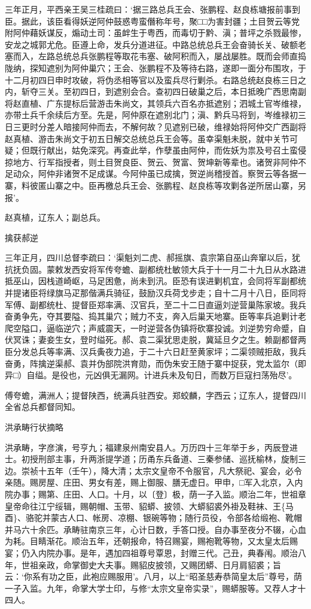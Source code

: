 \documentclass[]{article}
\begin{document}
三年正月，平西亲王吴三桂疏曰：`据三路总兵王会、张鹏程、赵良栋塘报前事到臣。据此，该臣看得妖逆阿仲鼓惑粤蛮僭称年号，聚□□为害封疆；土目贺云等党附阿仲藉妖谋反，煽动土司：虽衅生于粤西，而毒切于黔、滇；普坪之杀戮最惨，安龙之城郭尤危。臣遵上命，发兵分道进征。中路总统总兵王会奋骑长关、破额老塞而入，左路总统总兵张鹏程等取花韦塞、破阿积而入，屡战屡胜。既而会师直捣陇纳，探知遮别为阿仲巢穴；王会、张鹏程不及等待右路，遂即一面分布围攻，于十二月初四日申时攻破，将伪丞相等官以及蛮兵尽行剿杀。右路总统赵良栋三日之内，斩夺三关。至初四日，到遮别会合。查初四日破巢之后，本日抵晚广西思南副将赵直植、广东提标后营游击朱尚文，其领兵六百名亦抵遮别；泗城土官岑维禄，亦带土兵千余续后方至。先是，阿仲原在遮别北门；滇、黔兵马将到，岑维禄初三日三更时分差人暗接阿仲而去，不解何故？见遮别已破，维禄始将阿仲交广西副将赵真植、游击朱尚文于初五日解交总统总兵王会等。虽幸渠魁未脱，就中关节可疑；但既行献出，姑免深究。再查此举，作孽虽由阿仲，而佐妖为祟及号召土蛮侵掠地方、行军指授者，则土目贺良臣、贺云、贺富、贺坤新等辈也。诸贺非阿仲不足动众，阿仲非诸贺不足成谋。今阿仲虽已成擒，贺逆尚稽授首。察贺云等各据一寨，料彼匿山寨之中。臣再檄总兵王会、张鹏程、赵良栋等攻剿各逆所居山寨，另报'。

赵真植，辽东人；副总兵。

擒获郝逆

三年正月，四川总督李疏曰：`渠魁刘二虎、郝摇旗、袁宗第自巫山奔窜以后，犹抗抚负固。蒙敕发西安将军传夸蟾、副都统杜敏领大兵于十一月二十九日从水路进抵巫山，因栈道崎岖，马足困惫，尚未到汛。臣恐有误进剿机宜，会同将军副都统并提诸臣将绿旗马疋那偕满兵骑征，鼓励汉兵荷戈步走；自十二月十八日，臣同将军傅、副都统杜、提督臣郑率满、汉官兵，至二十二日直逼刘逆营巢陈家坡。我兵奋勇争先，夺其要隘、捣其巢穴；贼力不支，奔入后巢天地寨。臣等率兵追剿计老爬空隘口，逼临逆穴；声威震天，一时逆营各伪镇将砍寨投诚。刘逆势穷命蹙，自伏冥诛；妻妾生女，登时缢死。郝、袁二渠犹思走脱，冀延旦夕之生。赖副都督两臣分发总兵等率满、汉兵夤夜力追，于二十六日赶至黄家坪；二渠领贼拒敌，我兵奋勇，阵擒逆渠郝、袁并伪部院洪育勋，而伪朱安王随于寨中捉获，党太监尔（即异□）自缢。是役也，元凶俱无漏网。计进兵未及旬日，而数万巨寇扫荡殆尽'。

傅夸蟾，满洲人；提督陕西，统满兵驻西安。郑蛟麟，字西云；辽东人，提督四川全省总兵都督同知。

洪承畴行状摘略

洪承畴，字彦演，号亨九；福建泉州南安县人。万历四十三年举于乡，丙辰登进士。初授刑部主事，升两浙提学道；历甬东兵备道、三秦参储、巡抚榆林，旋制三边。崇祯十五年（壬午），降大清；太宗文皇帝不令服官，凡大祭祀、宴会，必令亲随。赐房屋、庄田、男女有差，赐上御服、膳无虚日。甲申，□军入北京，入内院办事；赐第、庄田、人口。十月，以〔登〕极，荫一子入监。顺治二年，世祖章皇帝命往江宁绥辑，赐朝帽、玉带、貂蟒、披领、大蟒貂裘外褂及鞋袜、王\{马酉\}、骆驼并蒙古人口、帐房、凉棚、银碗等物；随行员役，令部各给缎袍、靴帽并马六十余匹。承畴驻南京三年，心计日数，手答口授。自办事至夜分不辍，心血为耗。目睛渐花。顺治五年，还朝报命，特召赐宴，赐袍靴等物，又太皇太后赐宴；仍入内院办事。是年，遇加四祖尊号覃恩，封赠三代。己丑，典春闱。顺治八年，世祖亲政，命掌御史大夫事。赐貂皮披领，又赐团蟒、日月肩貂裘；旨云：`你系有功之臣，此袍应赐服用'。八月，以上``昭圣慈寿恭简皇太后''尊号，荫一子入监。九年，命掌大学士印，与修``太宗文皇帝实录''，赐蟒服等。又荐人才十四人。
\end{document}
